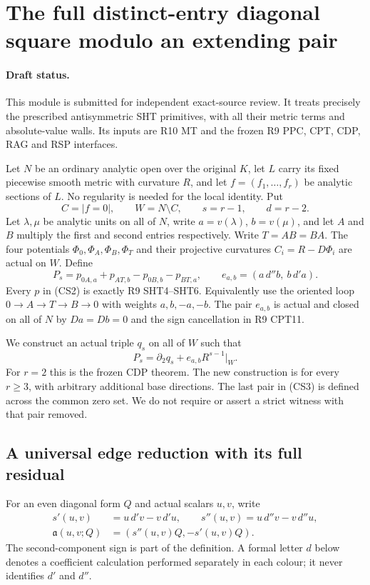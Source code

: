 \section{The full distinct-entry diagonal square modulo an extending pair}
\label{sec:r10-commuting-diagonal-relative-square}

\paragraph{Draft status.}
This module is submitted for independent exact-source review.  It treats
precisely the prescribed antisymmetric SHT primitives, with all their
metric terms and absolute-value walls.  Its inputs are R10 MT and the
frozen R9 PPC, CPT, CDP, RAG and RSP interfaces.

Let $N$ be an ordinary analytic open over the original $K$, let $L$
carry its fixed piecewise smooth metric with curvature $R$, and let
$f=(f_1,\ldots,f_r)$ be analytic sections of $L$.  No regularity is
needed for the local identity.  Put
\[
 C=|f=0|,\qquad W=N\setminus C,\qquad s=r-1,\qquad d=r-2.
 \tag{CS1}
\]
Let $\lambda,\mu$ be analytic units on all of $N$, write
$a=v(\lambda)$, $b=v(\mu)$, and let $A$ and $B$ multiply the first
and second entries respectively.  Write $T=AB=BA$.  The four
potentials $\Phi_0,\Phi_A,\Phi_B,\Phi_T$ and their projective
curvatures $C_i=R-D\Phi_i$ are actual on $W$.  Define
\[
 P_s=p_{0A,a}+p_{AT,b}-p_{0B,b}-p_{BT,a},\qquad
 e_{a,b}=(a\,d''b,\ b\,d'a).
 \tag{CS2}
\]
Every $p$ in (CS2) is exactly R9 SHT4--SHT6.  Equivalently use the
oriented loop $0\to A\to T\to B\to0$ with weights $a,b,-a,-b$.
The pair $e_{a,b}$ is actual and closed on all of $N$ by
$Da=Db=0$ and the sign cancellation in R9 CPT11.

We construct an actual triple $q_s$ on all of $W$ such that
\[
                    P_s=\partial_2q_s+e_{a,b}R^{s-1}|_W.
 \tag{CS3}
\]
For $r=2$ this is the frozen CDP theorem.  The new construction is
for every $r\ge3$, with arbitrary additional base directions.  The
last pair in (CS3) is defined across the common zero set.  We do not
require or assert a strict witness with that pair removed.

\subsection{A universal edge reduction with its full residual}

For an even diagonal form $Q$ and actual scalars $u,v$, write
\[
 \begin{split}
 s'(u,v)&=u\,d'v-v\,d'u,\qquad
 s''(u,v)=u\,d''v-v\,d''u,\\
 \mathfrak a(u,v;Q)&=(s''(u,v)Q,-s'(u,v)Q).
 \end{split}
 \tag{CS4}
\]
The second-component sign is part of the definition.  A formal
letter $d$ below denotes a coefficient calculation performed
separately in each colour; it never identifies $d'$ and $d''$.


